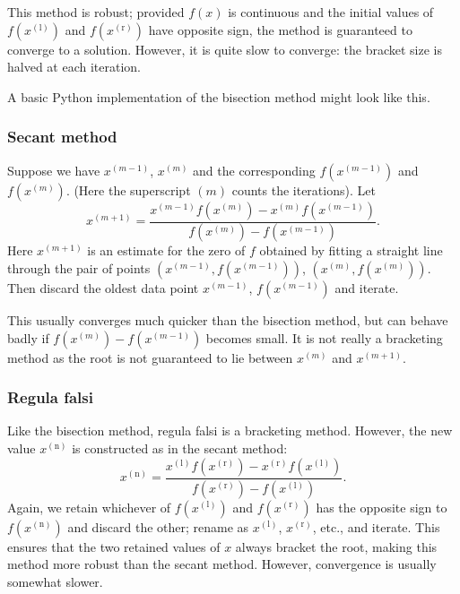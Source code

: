 This method is robust; provided $f(x)$ is continuous and the initial values of
$ f(x^{(\mathrm{l})}) $ and $ f(x^{(\mathrm{r})}) $ have opposite sign, the method is
guaranteed to converge to a solution.
However, it is quite slow to converge: the bracket size is halved at each iteration.

A basic Python implementation of the bisection method might look like this.


\subsubsection{Secant method}

Suppose we have \( x^{(m-1)} \), \( x^{(m)} \) and the corresponding
 \( f(x^{(m-1)}) \) and \( f(x^{(m)}) \). 
(Here the superscript $(m)$ counts the iterations).
Let
\begin{displaymath}
x^{(m+1)} = \frac{x^{(m-1)}f(x^{(m)}) - x^{(m)}f(x^{(m-1)})}{f(x^{(m)}) - f(x^{(m-1)})}.
\end{displaymath}
Here $x^{(m+1)}$ is an estimate for the zero of $f$ obtained by fitting a
straight line through the pair of points $(x^{(m-1)} , f(x^{(m-1)}))$,
$(x^{(m)} , f(x^{(m)}))$. 
Then discard the oldest data point \( x^{(m-1)} \), \( f(x^{(m-1)}) \) and iterate.

This usually converges much quicker than the bisection method,
but can behave badly if $ f(x^{(m)}) - f(x^{(m-1)}) $ becomes small.
It is not really a bracketing method as the root is not guaranteed
to lie between $ x^{(m)} $ and $ x^{(m+1)} $.


\subsubsection{Regula falsi}

Like the bisection method, regula falsi is a bracketing method.
However, the new value $ x^{(\mathrm{n})} $ is constructed as in the
secant method:
\begin{displaymath}
x^{(\mathrm{n})} = \frac{x^{(\mathrm{l})}f(x^{(\mathrm{r})})
- x^{(\mathrm{r})}f(x^{(\mathrm{l})})}{f(x^{(\mathrm{r})}) - f(x^{(\mathrm{l})})}.
\end{displaymath}
Again, we retain whichever of $ f(x^{(\mathrm{l})}) $ and $ f(x^{(\mathrm{r})}) $ has the
opposite sign to $ f(x^{(\mathrm{n})}) $ and discard the other;
rename as $ x^{(\mathrm{l})} $, $ x^{(\mathrm{r})} $, etc., and iterate.
This ensures that
the two retained values of $ x $ always bracket the root, making this
method more robust than the secant method. However, convergence
is usually somewhat slower.


